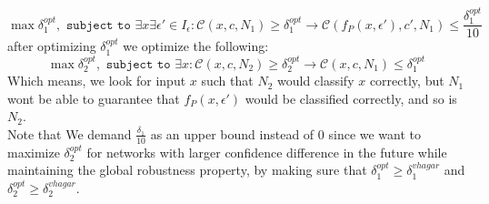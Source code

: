 \documentclass[11pt]{article}
\begin{document}
   
$$\max{\delta_1^{opt}}, \texttt{ subject to } \exists{x}\exists{\epsilon'}\in{I_\epsilon}: \mathcal{C}(x,c,N_1) \geq \delta_1^{opt} \rightarrow \mathcal{C}(f_P(x,\epsilon'),c',N_1)\leq \frac{\delta_1^{opt}}{10} $$
after optimizing $\delta_1^{opt}$ we optimize the following:
$$\max{\delta_2^{opt}}, \texttt{ subject to }  \exists{x}:  \mathcal{C}(x,c,N_2) \geq \delta_2^{opt} \rightarrow \mathcal{C}(x,c,N_1)\leq \delta_1^{opt}$$
Which means, we look for input $x$ such that $N_2$ would classify $x$ correctly, but $N_1$ wont be able to guarantee that $f_P(x,\epsilon')$ would be classified correctly, and so is $N_2$. 
\\
Note that We demand $\frac{\delta_1}{10}$ as an upper bound instead of $0$ since we want to maximize $\delta_2^{opt}$ for networks with larger confidence difference in the future while maintaining the global robustness property, by making sure that $\delta_1^{opt} \geq \delta^{vhagar}_1$ and $\delta_2^{opt} \geq \delta^{vhagar}_2$.
\end{document}
